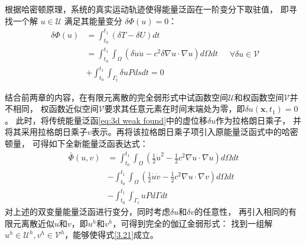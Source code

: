 根据哈密顿原理，系统的真实运动轨迹使得能量泛函在一阶变分下取驻值，
即寻找一个解 $u \in \mathcal{U}$ 满足其能量变分 $\delta \Phi(u) = 0$：
\begin{equation}\label{eq:3d weak found}
    \begin{aligned}
        \delta \Phi (u) &= \int_{t_0}^{t_1} \left( \delta T - \delta U \right) dt \\
        &= \int_{t_0}^{t_1}  \int_{\Omega} \left( \delta \dot u \dot u - c^2 \delta \nabla u \cdot \nabla u \right) d\Omega dt \\
        &+ \int_{t_0}^{t_1} \int_{\Gamma_t} \delta u P ds dt = 0
    \end{aligned}
    \quad
    \forall \delta u \in \mathcal V
\end{equation}

结合前两章的内容，在有限元离散的完全弱形式中试函数空间$\mathcal U$和权函数空间$\mathcal V$并不相同，
权函数近似空间$\mathcal V$要求其任意元素在时间末端处为零，即$δu(\boldsymbol x,t_1)=0$。
此时，将传统能量泛函\eqref{eq:3d weak found}中的虚位移$δu$作为拉格朗日乘子，
并将其采用拉格朗日乘子$v$表示。再将该拉格朗日乘子项引入原能量泛函式中的哈密顿量，
可得如下全新能量泛函表达式：
\begin{equation}\label{Φ_3d}
    \begin{aligned}
    \bar \Phi(u,v) &= \int_{t_0}^{t_1} \int_{\Omega} \left( \frac{1}{2} \dot u^2 - \frac{1}{2} c^2 \nabla u \cdot \nabla u \right) d\Omega dt \\
    &- \int_{t_0}^{t_1} \int_{\Omega}\left( \frac{1}{2} \dot u \dot v  - \frac{1}{2} c^2 \nabla u \cdot \nabla v \right) d\Omega dt \\
    & - \int_{t_0}^{t_1} \int_{\Gamma_t} u P d\Gamma dt 
    \end{aligned}
\end{equation}
对上述的双变量能量泛函进行变分，同时考虑$\delta u$和$\delta v$的任意性，
再引入相同的有限元离散近似$u$和$v$，即$u^h$和$v^h$，可得到完全的伽辽金弱形式：
找到一组解$u^h \in \mathcal{U}^h, v^h \in \mathcal{V}^h$，能够使得式\eqref{3.21}成立。


